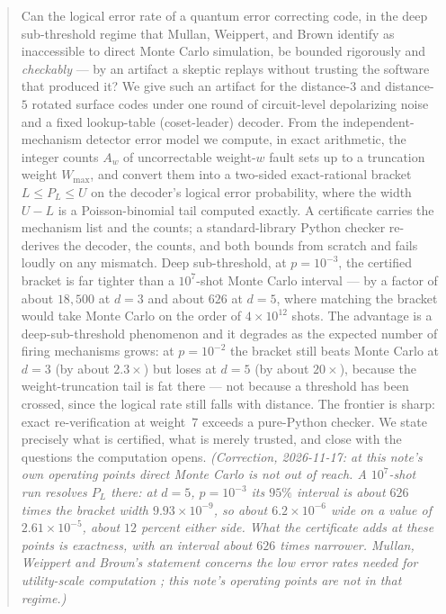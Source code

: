 \documentclass[11pt]{amsart}
\newcommand{\PL}{P_{L}}
\newcommand{\WMAX}{W_{\max}}
\theoremstyle{plain}
\theoremstyle{definition}
\theoremstyle{remark}
\begin{document}
\begin{abstract}
Can the logical error rate of a quantum error correcting code, in the deep
sub-threshold regime that Mullan, Weippert, and Brown \cite{MWB} identify as
inaccessible to direct Monte Carlo simulation, be bounded rigorously and
\emph{checkably} --- by an artifact a skeptic replays without trusting the
software that produced it? We give such an artifact for the distance-$3$ and
distance-$5$ rotated surface codes under one round of circuit-level
depolarizing noise and a fixed lookup-table (coset-leader) decoder. From the
independent-mechanism detector error model we compute, in exact arithmetic, the
integer counts $A_w$ of uncorrectable weight-$w$ fault sets up to a truncation
weight $\WMAX$, and convert them into a two-sided exact-rational bracket
$L\le \PL\le U$ on the decoder's logical error probability, where the width
$U-L$ is a Poisson-binomial tail computed exactly. A certificate carries the
mechanism list and the counts; a standard-library Python checker re-derives the
decoder, the counts, and both bounds from scratch and fails loudly on any
mismatch. Deep sub-threshold, at $p=10^{-3}$, the certified bracket is far
tighter than a $10^{7}$-shot Monte Carlo interval --- by a factor of about
$18{,}500$ at $d=3$ and about $626$ at $d=5$, where matching the bracket would
take Monte Carlo on the order of $4\times10^{12}$ shots. The advantage is a
deep-sub-threshold phenomenon and it degrades as the expected number of firing
mechanisms grows: at $p=10^{-2}$ the bracket still beats Monte Carlo at $d=3$
(by about $2.3\times$) but loses at $d=5$ (by about $20\times$), because the
weight-truncation tail is fat there --- not because a threshold has been
crossed, since the logical rate still falls with distance. The frontier is
sharp: exact re-verification at weight~$7$ exceeds a pure-Python checker. We
state precisely what is certified, what is merely trusted, and close with the
questions the computation opens. \emph{(Correction, 2026-11-17: at this note's own operating points direct Monte Carlo is not out of reach. A $10^7$-shot run resolves $\PL$ there: at $d=5$, $p=10^{-3}$ its $95\%$ interval is about $626$ times the bracket width $9.93\times10^{-9}$, so about $6.2\times10^{-6}$ wide on a value of $2.61\times10^{-5}$, about $12$ percent either side. What the certificate adds at these points is exactness, with an interval about $626$ times narrower. Mullan, Weippert and Brown's statement concerns the low error rates needed for utility-scale computation \cite[abstract]{MWB}; this note's operating points are not in that regime.)}
\end{abstract}
\end{document}
